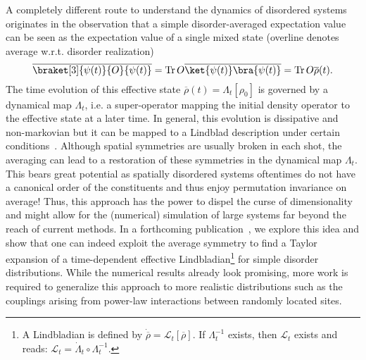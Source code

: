 
A completely different route to understand the dynamics of disordered systems originates in the observation that a simple disorder-averaged expectation value can be seen as the expectation value of a single mixed state (overline denotes average w.r.t. disorder realization)
\begin{equation}
	\overline{\braket[3]{\psi(t)}{O}{\psi(t)}} = \Tr O \overline{\ket{\psi(t)}\bra{\psi(t)}} = \Tr O \overline{\rho}(t).
\end{equation}
The time evolution of this effective state $\overline{\rho}(t) = \Lambda_t[\rho_0]$ is governed by a dynamical map $\Lambda_t$, i.e. a super-operator mapping the initial density operator to the effective state at a later time. In general, this evolution is dissipative and non-markovian but it can be mapped to a Lindblad description under certain conditions~\cite{kropfEffectiveDynamicsDisordered2016,gneitingIncoherentEnsembleDynamics2016,chenSimulatingOpenQuantum2018,gneitingDisorderdressedQuantumEvolution2020}. 
Although spatial symmetries are usually broken in each shot, the averaging can lead to a restoration of these symmetries in the dynamical map $\Lambda_t$. This bears great potential as spatially disordered systems oftentimes do not have a canonical order of the constituents and thus enjoy permutation invariance on average! Thus, this approach has the power to dispel the curse of dimensionality and might allow for the (numerical) simulation of large systems far beyond the reach of current methods. In a forthcoming publication~\cite{erpeldingSymmetries}, we explore this idea and show that one can indeed exploit the average symmetry to find a Taylor expansion of a time-dependent effective Lindbladian\footnote{A Lindbladian is defined by $\dot{\overline{\rho}} = \mathcal{L}_t[\overline{\rho}]$. If $\Lambda_t^{-1}$ exists, then $\mathcal{L}_t$ exists and reads: $\mathcal{L}_t = \dot{\Lambda}_t\circ\Lambda_t^{-1}$.} for simple disorder distributions. While the numerical results already look promising, more work is required to generalize this approach to more realistic distributions such as the couplings arising from power-law interactions between randomly located sites.


